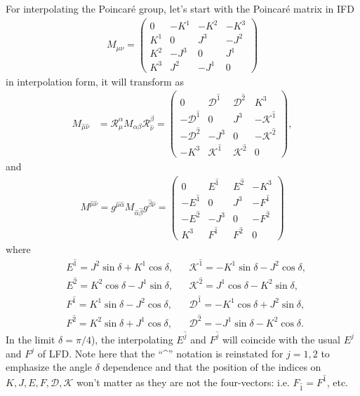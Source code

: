 \documentclass[aps,reprint,notitlepage,nofootinbib,superscriptaddress]{revtex4-1}
\newcommand{\muT}{\hat{\mu}}
\newcommand{\nuT}{\hat{\nu}}
\newcommand{\itP}[1]{\hat{#1}}
\begin{document}
For interpolating the Poincar\'e group, let's start with the Poincar\'e matrix in IFD
\begin{align}\label{eqn:J_mu_nu_IF}
  M_{\mu\nu}=\begin{pmatrix}
     0&-K^1&-K^2&-K^3\\
     K^1&0&J^3&-J^2\\
     K^2&-J^3&0&J^1\\
     K^3&J^2&-J^1&0
     \end{pmatrix}
\end{align}
in interpolation form, it will transform as
\begin{align}\label{eqn:Poincare_Matrix_Interpolation_superscripts}
  M_{\muT\nuT}
  &=\mathcal{R}_{\hat{\mu}}^{{\alpha}}M_{\alpha\beta}\mathcal{R}_{\hat{\nu}}^{{\beta}}=\begin{pmatrix}
    0 & {\mathcal{D}}^{\itP{1}} & {\mathcal{D}}^{\itP{2}} & {K}^{3}\\
    -{\mathcal{D}}^{\itP{1}} & 0 & {J}^{3} & -{\mathcal{K}}^{\itP{1}}\\
    -{\mathcal{D}}^{\itP{2}} & -{J}^{3} & 0 & -{\mathcal{K}}^{\itP{2}}\\
    -{K}^{3} & {\mathcal{K}}^{\itP{1}} & {\mathcal{K}}^{\itP{2}} & 0
  \end{pmatrix},
\end{align}
and
\begin{align}
  M^{\muT\nuT}
  =
  g^{\muT\itP{\alpha}}M_{\itP{\alpha}\itP{\beta}}g^{\itP{\beta}\nuT}
  =
  \begin{pmatrix}
    0 & {E}^{\itP{1}} & {E}^{\itP{2}} & -{K}^{3}\\
    -{E}^{\itP{1}} & 0 & {J}^{3} & -{F}^{\itP{1}}\\
    -{E}^{\itP{2}} & -{J}^{3} & 0 & -{F}^{\itP{2}}\\
    {K}^{3} & {F}^{\itP{1}} & {F}^{\itP{2}} & 0
  \end{pmatrix}
\end{align}
where
\begin{align}\label{eqn:E_F_D_K_Definition_Interpolation_Angle}
  &E^{\itP{1}}=J^{2}\sin\delta+K^{1}\cos\delta,
  &&\mathcal{K}^{\itP{1}}=-K^{1}\sin\delta-J^{2}\cos\delta, \nonumber\\
  &E^{\itP{2}}=K^{2}\cos\delta-J^{1}\sin\delta,
  &&\mathcal{K}^{\itP{2}}=J^{1}\cos\delta-K^{2}\sin\delta, \nonumber\\
  &F^{\itP{1}}=K^{1}\sin\delta-J^{2}\cos\delta,
  &&\mathcal{D}^{\itP{1}}=-K^{1}\cos\delta+J^{2}\sin\delta, \nonumber\\
  &F^{\itP{2}}=K^{2}\sin\delta+J^{1}\cos\delta,
  &&\mathcal{D}^{\itP{2}}=-J^{1}\sin\delta-K^{2}\cos\delta.
\end{align}
In the limit $\delta=\pi/4$), the interpolating $E^{\itP{j}}$ and $F^{\itP{j}}$ will coincide with the usual $E^{j}$ and $F^{j}$ of LFD.
Note here that the ``\textasciicircum'' notation is reinstated for $j=1, 2$ to emphasize the angle $\delta$ dependence and that the position of the indices on $K, J, E, F, \mathcal{D}, \mathcal{K}$ won't matter as they are not the four-vectors: i.e. $F_{\itP{1}}=F^{\itP{1}}$, etc.
\end{document}
